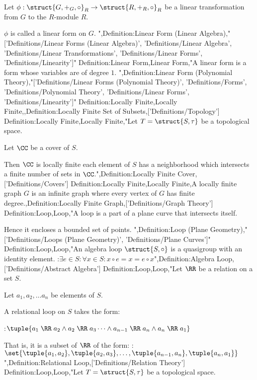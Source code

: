 Let $\phi: \struct {G, +_G, \circ}_R \to \struct {R, +_R, \circ}_R$ be a linear transformation from $G$ to the $R$-module $R$.


$\phi$ is called a linear form on $G$.
",Definition:Linear Form (Linear Algebra),"['Definitions/Linear Forms (Linear Algebra)', 'Definitions/Linear Algebra', 'Definitions/Linear Transformations', 'Definitions/Linear Forms', 'Definitions/Linearity']"
Definition:Linear Form,Linear Form,"A linear form is a form whose variables are of degree $1$.
",Definition:Linear Form (Polynomial Theory),"['Definitions/Linear Forms (Polynomial Theory)', 'Definitions/Forms', 'Definitions/Polynomial Theory', 'Definitions/Linear Forms', 'Definitions/Linearity']"
Definition:Locally Finite,Locally Finite,,Definition:Locally Finite Set of Subsets,['Definitions/Topology']
Definition:Locally Finite,Locally Finite,"Let $T = \struct {S, \tau}$ be a topological space.

Let $\CC$ be a cover of $S$.


Then $\CC$ is locally finite  each element of $S$ has a neighborhood which intersects a finite number of sets in $\CC$.",Definition:Locally Finite Cover,['Definitions/Covers']
Definition:Locally Finite,Locally Finite,A locally finite graph $G$ is an infinite graph where every vertex of $G$ has finite degree.,Definition:Locally Finite Graph,['Definitions/Graph Theory']
Definition:Loop,Loop,"A loop is a part of a plane curve that intersects itself.

Hence it encloses a bounded set of points.
",Definition:Loop (Plane Geometry),"['Definitions/Loops (Plane Geometry)', 'Definitions/Plane Curves']"
Definition:Loop,Loop,"An algebra loop $\struct {S, \circ}$ is a quasigroup with an identity element.
:$\exists e \in S: \forall x \in S: x \circ e = x = e \circ x$",Definition:Algebra Loop,['Definitions/Abstract Algebra']
Definition:Loop,Loop,"Let $\RR$ be a relation on a set $S$.

Let $a_1, a_2, \ldots a_n$ be elements of $S$.


A relational loop on $S$ takes the form:

:$\tuple {a_1 \mathrel \RR a_2 \land a_2 \mathrel \RR a_3 \dots \land a_{n - 1} \mathrel \RR a_n \land a_n \mathrel \RR a_1}$

That is, it is a subset of $\RR$ of the form:
:$\set {\tuple {a_1, a_2}, \tuple {a_2, a_3}, \ldots, \tuple {a_{n - 1}, a_n}, \tuple {a_n, a_1} }$",Definition:Relational Loop,['Definitions/Relation Theory']
Definition:Loop,Loop,"Let $T = \struct {S, \tau}$ be a topological space.

